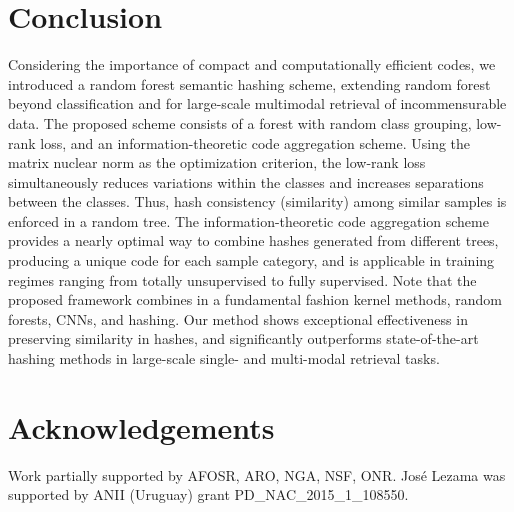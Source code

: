 \documentclass[runningheads]{llncs}
\begin{document}
\section{Conclusion} \label{sec:con}
Considering the importance of compact and computationally efficient codes, we
introduced a random forest semantic hashing scheme,
 extending random forest  beyond classification
and for large-scale multimodal retrieval of incommensurable data.  The proposed
scheme consists of a forest with random class grouping, low-rank loss,  and an
information-theoretic code aggregation scheme.  Using the matrix nuclear norm as
the optimization criterion, the low-rank loss simultaneously reduces variations
within the classes and increases separations between the classes.  Thus, hash
consistency (similarity) among similar samples is enforced in a random tree.
The information-theoretic code aggregation scheme provides a nearly optimal way
to combine hashes generated from different trees, producing a unique code for
each sample category, and is applicable in training regimes ranging from totally
unsupervised to fully supervised.  Note that the proposed framework combines in
a fundamental fashion  kernel methods, random forests, CNNs, and
 hashing.  Our method shows exceptional effectiveness in
preserving similarity in hashes, and significantly outperforms state-of-the-art
hashing methods in large-scale single- and multi-modal retrieval tasks.

\section*{Acknowledgements}
Work partially supported by AFOSR, ARO, NGA, NSF, ONR. Jos\'e Lezama was supported by ANII (Uruguay) grant PD\_NAC\_2015\_1\_108550.



\end{document}
